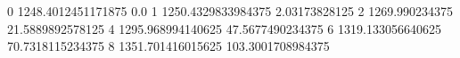 0 1248.4012451171875 0.0
1 1250.4329833984375 2.03173828125
2 1269.990234375 21.5889892578125
4 1295.968994140625 47.5677490234375
6 1319.133056640625 70.7318115234375
8 1351.701416015625 103.3001708984375
